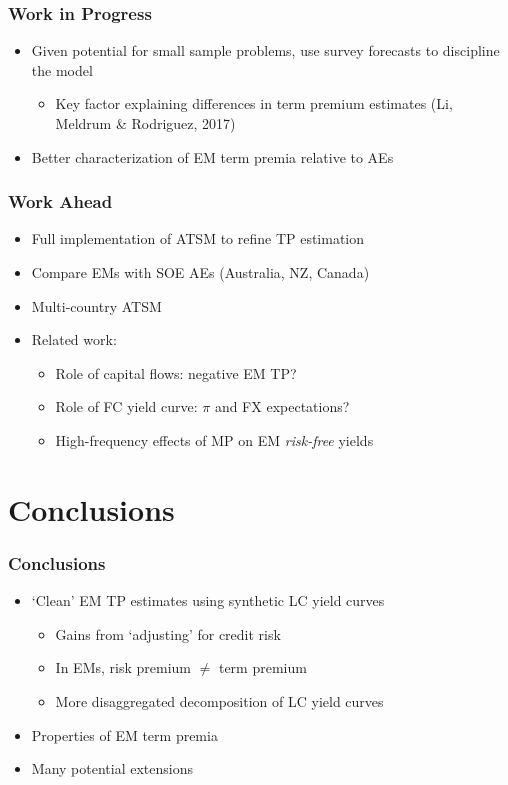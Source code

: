 \documentclass[12pt, xcolor=dvipsnames]{beamer} 			         %
\begin{document}
\begin{frame}
	\frametitle{Work in Progress}
	\begin{itemize}
		\item Given potential for small sample problems, use survey forecasts to discipline the model
		\begin{itemize}
			\item Key factor explaining differences in term premium estimates (Li, Meldrum \& Rodriguez, 2017)
		\end{itemize}
	\item Better characterization of EM term premia relative to AEs
	\end{itemize}
\end{frame}

\begin{frame}
	\frametitle{Work Ahead}
	\begin{itemize}
		\item Full implementation of ATSM to refine TP estimation
		\item Compare EMs with SOE AEs (Australia, NZ, Canada)
		\item Multi-country ATSM
		\pause
		\item Related work:
		\begin{itemize}
			\item Role of capital flows: negative EM TP?
			\item Role of FC yield curve: $\pi$ and FX expectations?
			\item High-frequency effects of MP on EM \textit{risk-free} yields
		\end{itemize}
	\end{itemize}
\end{frame}

\section{Conclusions}

\begin{frame}
	\frametitle{Conclusions}
	\begin{itemize}
		\item `Clean' EM TP estimates using synthetic LC yield curves
		\begin{itemize}
			\item Gains from `adjusting' for credit risk
			\item In EMs, risk premium $\neq$ term premium
			\item More disaggregated decomposition of LC yield curves
		\end{itemize}
		\item Properties of EM term premia
		\item Many potential extensions
	\end{itemize}
\end{frame}
\end{document}
